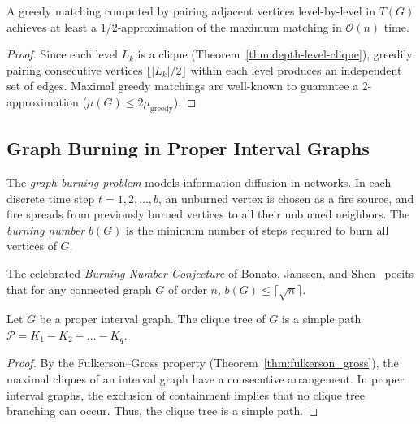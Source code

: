 \begin{theorem}
\label{thm:matching-approximation}
A greedy matching computed by pairing adjacent vertices level-by-level in $T(G)$ achieves at least a $1/2$-approximation of the maximum matching in $\mathcal{O}(n)$ time.
\end{theorem}
\begin{proof}
Since each level $L_k$ is a clique (Theorem~\ref{thm:depth-level-clique}), greedily pairing consecutive vertices $\lfloor |L_k|/2 \rfloor$ within each level produces an independent set of edges. Maximal greedy matchings are well-known to guarantee a 2-approximation ($\mu(G) \le 2 \mu_{\text{greedy}}$).
\end{proof}

\subsection{Graph Burning in Proper Interval Graphs}

The \emph{graph burning problem} models information diffusion in networks. In each discrete time step $t = 1, 2, \dots, b$, an unburned vertex is chosen as a fire source, and fire spreads from previously burned vertices to all their unburned neighbors. The \emph{burning number} $b(G)$ is the minimum number of steps required to burn all vertices of $G$.

The celebrated \emph{Burning Number Conjecture} of Bonato, Janssen, and Shen~\cite{bonato2016burning} posits that for any connected graph $G$ of order $n$, $b(G) \le \lceil \sqrt{n} \rceil$.

\begin{theorem}
\label{thm:interval-clique-tree-path}
Let $G$ be a proper interval graph. The clique tree of $G$ is a simple path $\mathcal{P} = K_1 - K_2 - \dots - K_q$.
\end{theorem}
\begin{proof}
By the Fulkerson--Gross property (Theorem~\ref{thm:fulkerson_gross}), the maximal cliques of an interval graph have a consecutive arrangement. In proper interval graphs, the exclusion of containment implies that no clique tree branching can occur. Thus, the clique tree is a simple path.
\end{proof}

